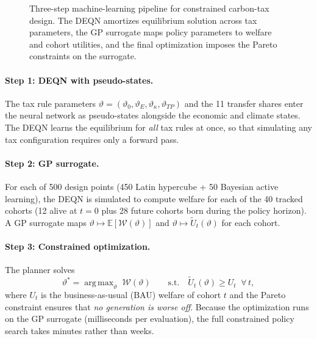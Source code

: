 \documentclass[11pt,a4paper]{report}
\DeclareMathOperator*{\argmax}{arg\,max}
\begin{document}
\begin{figure}[ht]
\centering
{}
\caption{Three-step machine-learning pipeline for constrained carbon-tax design.  The DEQN amortizes equilibrium solution across tax parameters, the GP surrogate maps policy parameters to welfare and cohort utilities, and the final optimization imposes the Pareto constraints on the surrogate.}
\label{fig:olg_iam_pipeline}
\end{figure}

\paragraph{Step 1: DEQN with pseudo-states.}
The tax rule parameters $\vartheta = (\vartheta_0, \vartheta_E, \vartheta_\kappa, \vartheta_{TP})$ and the 11 transfer shares enter the neural network as pseudo-states alongside the economic and climate states.  The DEQN learns the equilibrium for \emph{all} tax rules at once, so that simulating any tax configuration requires only a forward pass.

\paragraph{Step 2: GP surrogate.}
For each of 500 design points (450 Latin hypercube + 50 Bayesian active learning), the DEQN is simulated to compute welfare for each of the 40 tracked cohorts (12 alive at $t=0$ plus 28 future cohorts born during the policy horizon).  A GP surrogate maps $\vartheta \mapsto \mathbb{E}[\mathcal{W}(\vartheta)]$ and $\vartheta \mapsto \tilde{U}_t(\vartheta)$ for each cohort.

\paragraph{Step 3: Constrained optimization.}
The planner solves
\begin{equation}
\vartheta^* = \argmax_\vartheta\;\mathcal{W}(\vartheta) \qquad \text{s.t.}\quad \tilde{U}_t(\vartheta) \geq U_t \;\;\forall\, t,
\label{eq:pareto_opt}
\end{equation}
where $U_t$ is the business-as-usual (BAU) welfare of cohort $t$ and the Pareto constraint ensures that \emph{no generation is worse off}.  Because the optimization runs on the GP surrogate (milliseconds per evaluation), the full constrained policy search takes minutes rather than weeks.
\end{document}
